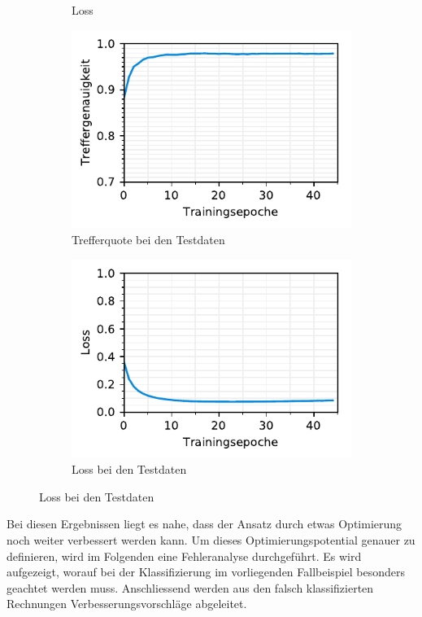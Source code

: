 \begin{figure}[h!]
\begin{subfigure}[b]{0.5\linewidth}
    \caption{Loss} 
    \label{text-class-results:loss} 
    \vspace{2ex}
  \end{subfigure} 
  \begin{subfigure}[b]{0.5\linewidth}
    \centering
    \includegraphics[scale=1]{graphics/matplot/textual-class__val_acc.pdf} 
    \caption{Trefferquote bei den Testdaten} 
    \label{text-class-results:val_acc} 
  \end{subfigure}%
  \begin{subfigure}[b]{0.5\linewidth}
    \centering
    \includegraphics[scale=1]{graphics/matplot/textual-class__val_loss.pdf} 
    \caption{Loss bei den Testdaten} 
    \label{text-class-results:val_loss} 
  \end{subfigure}
  \centering
\end{figure}

Bei diesen Ergebnissen liegt es nahe, dass der Ansatz durch etwas Optimierung noch weiter verbessert werden kann. Um dieses Optimierungspotential genauer zu definieren, wird im Folgenden eine Fehleranalyse durchgeführt. Es wird aufgezeigt, worauf bei der Klassifizierung im vorliegenden Fallbeispiel besonders geachtet werden muss. Anschliessend werden aus den falsch klassifizierten Rechnungen Verbesserungsvorschläge abgeleitet. 

